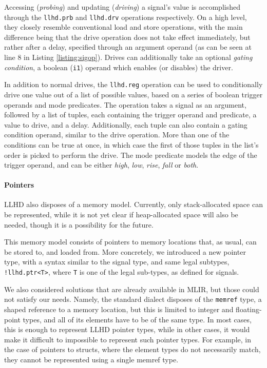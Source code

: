 Accessing (\textit{probing}) and updating (\textit{driving}) a signal's value is accomplished through the \texttt{llhd.prb} and \texttt{llhd.drv} operations respectively. On a high level, they closely resemble conventional load and store operations, with the main difference being that the drive operation does not take effect immediately, but rather after a delay, specified through an argument operand (as can be seen at line $8$ in Listing \ref{listing:sigop}). Drives can additionally take an optional \textit{gating condition}, a boolean (\texttt{i1}) operand which enables (or disables) the driver.

In addition to normal drives, the \texttt{llhd.reg} operation can be used to conditionally drive one value out of a list of possible values, based on a series of boolean trigger operands and mode predicates. The operation takes a signal as an argument, followed by a list of tuples, each containing the trigger operand and predicate, a value to drive, and a delay. Additionally, each tuple can also contain a gating condition operand, similar to the drive operation. More than one of the conditions can be true at once, in which case the first of those tuples in the list's order is picked to perform the drive. The mode predicate models the edge of the trigger operand, and can be either \textit{high}, \textit{low}, \textit{rise}, \textit{fall} or \textit{both}.

\paragraph{Pointers}
LLHD also disposes of a memory model. Currently, only stack-allocated space can be represented, while it is not yet clear if heap-allocated space will also be needed, though it is a possibility for the future.

This memory model consists of pointers to memory locations that, as usual,  can be stored to, and loaded from. More concretely, we introduced a new pointer type, with a syntax similar to the signal type, and same legal subtypes, \ie \texttt{!llhd.ptr<T>}, where \texttt{T} is one of the legal sub-types, as defined for signals.

We also considered solutions that are already available in MLIR, but those could not satisfy our needs. Namely, the standard dialect disposes of the \texttt{memref} type, a shaped reference to a memory location, but this is limited to integer and floating-point types, and all of its elements have to be of the same type. In most cases, this is enough to represent LLHD pointer types, while in other cases, it would make it difficult to impossible to represent such pointer types. For example, in the case of pointers to structs, where the element types do not necessarily match, they cannot be represented using a single memref type.

